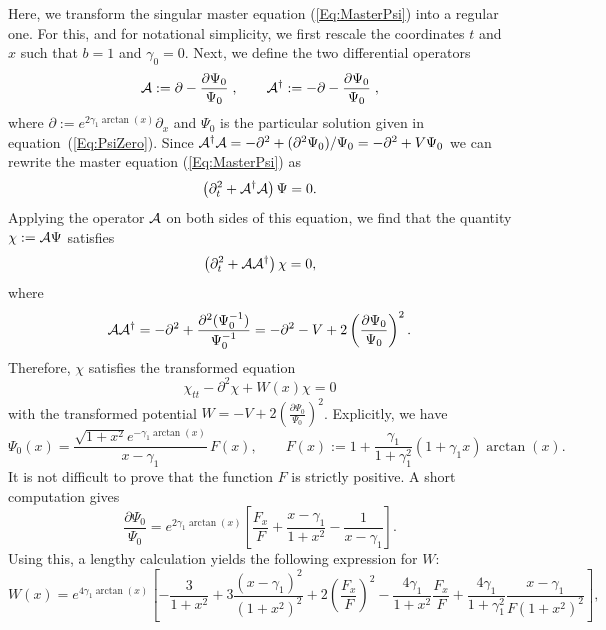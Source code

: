 \documentclass[           %
               showpacs,            %
               preprintnumbers,     %
               aps,                 %
               prd,                 %
               superscriptaddress,      %
               nofootinbib,         %
               tightenlines,        %
               floats,floatfix      %
               ]{revtex4}
\begin{document}
Here, we transform the singular master equation (\ref{Eq:MasterPsi})
into a regular one. For this, and for notational simplicity, we first
rescale the coordinates $t$ and $x$ such that $b=1$ and $\gamma_0 =
0$. Next, we define the two differential operators
\begin{displaymath}
{\cal A} := \partial - \frac{\partial\Psi_0}{\Psi_0}\; ,\qquad
{\cal A}^\dagger := -\partial - \frac{\partial\Psi_0}{\Psi_0}\; ,
\end{displaymath}
where $\partial := e^{2\gamma_1\arctan(x)}\partial_x$ and $\Psi_0$ is
the particular solution given in equation~(\ref{Eq:PsiZero}). Since ${\cal
A}^\dagger {\cal A} = -\partial^2 + (\partial^2\Psi_0)/\Psi_0 =
-\partial^2 + V\Psi_0$ we can rewrite the master equation
(\ref{Eq:MasterPsi}) as
\begin{equation}
\left( \partial_t^2 + {\cal A}^\dagger {\cal A} \right)\Psi = 0.
\end{equation}
Applying the operator ${\cal A}$ on both sides of this equation, we
find that the quantity $\chi := {\cal A}\Psi$ satisfies
\begin{displaymath}
\left( \partial_t^2 + {\cal A} {\cal A}^\dagger \right)\chi = 0,
\end{displaymath}
where
\begin{displaymath}
{\cal A} {\cal A}^\dagger 
 = -\partial^2 + \frac{\partial^2(\Psi_0^{-1})}{\Psi_0^{-1}}
 = -\partial^2 - V + 2\left( \frac{\partial\Psi_0}{\Psi_0} \right)^2.
\end{displaymath}
Therefore, $\chi$ satisfies the transformed equation
\begin{equation}
\chi_{tt} - \partial^2\chi + W(x)\chi = 0
\label{Eq:MasterChi}
\end{equation}
with the transformed potential $W = -V + 2\left(
\frac{\partial\Psi_0}{\Psi_0} \right)^2$. Explicitly, we have
\begin{displaymath}
\Psi_0(x) = \frac{\sqrt{1+x^2} e^{-\gamma_1\arctan(x)}}{x-\gamma_1}\, F(x),
\qquad F(x) := 1 + \frac{\gamma_1}{1 + \gamma_1^2}(1 + \gamma_1 x)\arctan(x).
\end{displaymath}
It is not difficult to prove that the function $F$ is strictly
positive. A short computation gives
\begin{equation}
\frac{\partial\Psi_0}{\Psi_0} = e^{2\gamma_1\arctan(x)}\left[
\frac{F_x}{F} + \frac{x-\gamma_1}{1+x^2} - \frac{1}{x-\gamma_1} \right].
\end{equation}
Using this, a lengthy calculation yields the following expression for $W$:
\begin{equation}
W(x) = e^{4\gamma_1\arctan(x)}\left[ 
 -\frac{3}{1+x^2} + 3\frac{(x-\gamma_1)^2}{(1+x^2)^2} 
 + 2\left( \frac{F_x}{F} \right)^2 - \frac{4\gamma_1}{1+x^2}\frac{F_x}{F}
 + \frac{4\gamma_1}{1+\gamma_1^2}\frac{x-\gamma_1}{F(1+x^2)^2} \right],
\end{equation}
\end{document}
